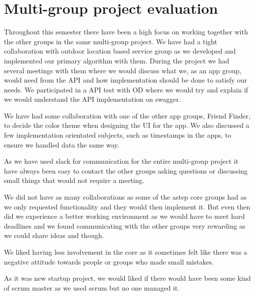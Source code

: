 \section{Multi-group project evaluation}
Throughout this semester there have been a high focus on working together with the other groups in the same multi-group project.
We have had a tight collaboration with outdoor location based service group as we developed and implemented our primary algorithm with them.
During the project we had several meetings with them where we would discuss what we, as an app group, would need from the API and how implementation should be done to satisfy our needs.
We participated in a API test with OD where we would try and explain if we would understand the API implementation on swagger.

We have had some collaboration with one of the other app groups, Friend Finder, to decide the color theme when designing the UI for the app.
We also discussed a few implementation orientated subjects, such as timestamps in the apps, to ensure we handled data the same way.

As we have used slack for communication for the entire multi-group project it have always been easy to contact the other groups asking questions or discussing small things that would not require a meeting.

We did not have as many collaborations as some of the \gls{astep} core groups had as we only requested functionality and they would then implement it.
But even then did we experience a better working environment as we would have to meet hard deadlines and we found communicating with the other groups very rewarding as we could share ideas and though.
 
We liked having less involvement in the core as it sometimes felt like there was a negative attitude towards people or groups who made small mistakes.

As it was new startup project, we would liked if there would have been some kind of scrum master as we used scrum but no one managed it.